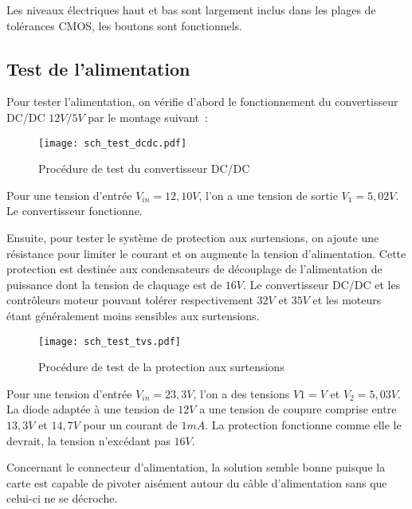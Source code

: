 \vspace{1cm}

Les niveaux électriques haut et bas sont largement inclus dans les plages de tolérances CMOS, les boutons sont fonctionnels.

\subsection{Test de l'alimentation} %

Pour tester l'alimentation, on vérifie d'abord le fonctionnement du convertisseur DC/DC $12V/5V$ par le montage suivant~:

\begin{figure}[H]
    \centering
    \texttt{[image: sch\_test\_dcdc.pdf]}
    \decoRule
    \caption[
    Procédure de test du convertisseur DC/DC]{
    Procédure de test du convertisseur DC/DC}
    \label{fig:Procédure de test du convertisseur DC/DC}
	\end{figure}

\vspace{1cm}

Pour une tension d'entrée $V_{in}=12,10V$, l'on a une tension de sortie $V_{1}=5,02V$. Le convertisseur fonctionne.

\vspace{1cm}

Ensuite, pour tester le système de protection aux surtensions, on ajoute une résistance pour limiter le courant et on augmente la tension d'alimentation. Cette protection est destinée aux condensateurs de découplage de l'alimentation de puissance dont la tension de claquage est de $16V$. Le convertisseur DC/DC et les contrôleurs moteur pouvant tolérer respectivement $32V$ et $35V$ et les moteurs étant généralement moins sensibles aux surtensions.

\begin{figure}[H]
    \centering
    \texttt{[image: sch\_test\_tvs.pdf]}
    \decoRule
    \caption[
    Procédure de test de la protection aux surtensions]{
    Procédure de test de la protection aux surtensions}
    \label{fig:Procédure de test de la protection aux surtensions}
	\end{figure}

\vspace{1cm}

Pour une tension d'entrée $V_{in}=23,3V$, l'on a des tensions $V{1}=V$ et $V_{2}=5,03V$. La diode adaptée à une tension de $12V$ a une tension de coupure comprise entre $13,3V$ et $14,7V$ pour un courant de $1mA$. La protection fonctionne comme elle le devrait, la tension n'excédant pas $16V$. 

\vspace{1cm}

Concernant le connecteur d'alimentation, la solution semble bonne puisque la carte est capable de pivoter aisément autour du câble d'alimentation sans que celui-ci ne se décroche.

